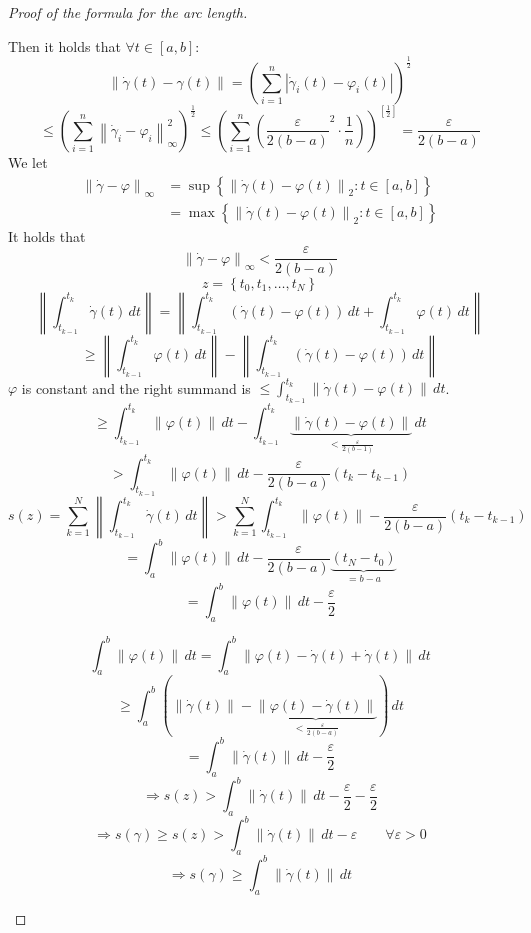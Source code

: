 \documentclass[a4paper,landscape,twocolumn]{article}
\theoremstyle{definition}
\newcommand\set[1]{\left\{#1\right\}}
\newcommand\abs[1]{\left|#1\right|}
\newcommand\norm[1]{\left\|#1\right\|}
\newcommand\inorm[1]{\left\|#1\right\|_\infty}
\begin{document}
\begin{proof}[Proof of the formula for the arc length]
\begin{enumerate}
      Then it holds that $\forall t \in [a,b]$:
      \[ \norm{\dot\gamma(t) - \gamma(t)} = \left(\sum_{i=1}^n \abs{\dot\gamma_i(t) - \varphi_i(t)}\right)^{\frac12} \]
      \[
        \leq \left(\sum_{i=1}^n \inorm{\dot\gamma_i - \varphi_i}^2\right)^{\frac12}
        \leq \left(\sum_{i=1}^n \left(\frac{\varepsilon}{2(b - a)}^2 \cdot \frac1n\right)\right)^[\frac12]
        = \frac{\varepsilon}{2 (b - a)}
      \]
      We let
      \begin{align*}
        \inorm{\dot\gamma - \varphi}
          &= \sup\set{\norm{\dot\gamma(t) - \varphi(t)}_2: t \in [a,b]} \\
          &= \max\set{\norm{\dot\gamma(t) - \varphi(t)}_2: t \in [a,b]}
      \end{align*}
      It holds that
      \[ \inorm{\dot\gamma - \varphi} < \frac{\varepsilon}{2 (b - a)} \]
      \[ z = \set{t_0, t_1, \ldots, t_N} \]
      \[
        \norm{\int_{t_{k-1}}^{t_k} \dot\gamma(t) \, dt}
        = \norm{\int_{t_{k-1}}^{t_k} (\dot\gamma(t) - \varphi(t)) \, dt + \int_{t_{k-1}}^{t_k} \varphi(t) \, dt}
      \] \[
        \geq \norm{\int_{t_{k-1}}^{t_k} \varphi(t) \, dt} - \norm{\int_{t_{k-1}}^{t_k} (\dot\gamma(t) - \varphi(t)) \, dt}
      \]
      $\varphi$ is constant and the right summand is $\leq \int_{t_{k-1}}^{t_k} \norm{\dot\gamma(t) - \varphi(t)} \, dt$.
      \[
        \geq \int_{t_{k-1}}^{t_k} \norm{\varphi(t)} \, dt - \int_{t_{k-1}}^{t_k} \underbrace{\norm{\dot\gamma(t) - \varphi(t)}}_{< \frac{\varepsilon}{2(b-1)}} \, dt
      \] \[
        > \int_{t_{k-1}}^{t_k} \norm{\varphi(t)} \, dt - \frac{\varepsilon}{2(b - a)} (t_k - t_{k-1})
      \] \[
        s(z) = \sum_{k=1}^N \norm{\int_{t_{k-1}}^{t_k} \dot\gamma(t) \, dt}
          > \sum_{k=1}^N \int_{t_{k-1}}^{t_k} \norm{\varphi(t)} - \frac{\varepsilon}{2(b - a)} (t_{k} - t_{k-1})
      \] \[
        = \int_a^b \norm{\varphi(t)} \, dt - \frac{\varepsilon}{2(b - a)} \underbrace{(t_N - t_0)}_{= b - a}
      \] \[
        = \int_a^b \norm{\varphi(t)} \, dt - \frac{\varepsilon}{2}
      \]

      \[
        \int_a^b \norm{\varphi(t)} \, dt = \int_a^b \norm{\varphi(t) - \dot\gamma(t) + \dot\gamma(t)} \, dt
      \] \[
        \geq \int_a^b \left(\norm{\dot\gamma(t)} - \underbrace{\norm{\varphi(t) - \dot\gamma(t)}}_{< \frac{\varepsilon}{2(b - a)}}\right) \, dt
      \] \[
        = \int_a^b \norm{\dot\gamma(t)} \, dt - \frac{\varepsilon}{2}
      \] \[
        \Rightarrow s(z) > \int_a^b \norm{\dot\gamma(t)} \, dt - \frac\varepsilon2 - \frac\varepsilon2
      \] \[
        \Rightarrow s(\gamma) \geq s(z) > \int_a^b \norm{\dot\gamma(t)} \, dt - \varepsilon
        \qquad \forall \varepsilon > 0
      \] \[
        \Rightarrow s(\gamma) \geq \int_a^b \norm{\dot\gamma(t)} \, dt
      \]
  \end{enumerate}
\end{proof}
\end{document}
